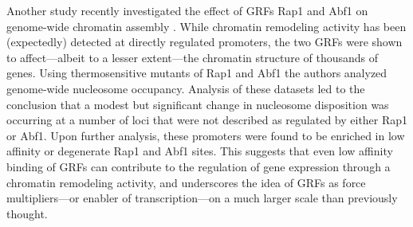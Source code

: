 Another study recently investigated the effect of GRFs Rap1 and Abf1 on genome-wide chromatin assembly \cite{ganapathi:2011:extensive}.
While chromatin remodeling activity has been (expectedly) detected at directly regulated promoters, the two GRFs were shown to affect---albeit to a lesser extent---the chromatin structure of thousands of genes. 
Using thermosensitive mutants of Rap1 and Abf1 the authors analyzed genome-wide nucleosome occupancy.
Analysis of these datasets led to the conclusion that a modest but significant change in nucleosome disposition was occurring at a number of loci that were not described as regulated by either Rap1 or Abf1.
Upon further analysis, these promoters were found to be enriched in low affinity or degenerate Rap1 and Abf1 sites. 
This suggests that even low affinity binding of GRFs can contribute to the regulation of gene expression through a chromatin remodeling activity, and underscores the idea of GRFs as force multipliers---or enabler of transcription---on a much larger scale than previously thought. 



 

